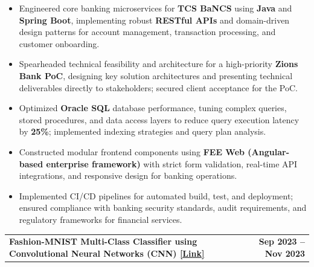 \documentclass[10pt,a4paper]{article}
\makeatletter
\newcommand{\entry}[2]{%
    \noindent
    \begin{tabularx}{\linewidth}{@{}X r@{}}
        \textbf{#1} & \textbf{#2}
    \end{tabularx}
    \vspace{-2pt}
}
\makeatother
\begin{document}
\begin{itemize}

\item Engineered core banking microservices for \textbf{TCS BaNCS} using \textbf{Java} and \textbf{Spring Boot}, implementing robust \textbf{RESTful APIs} and domain-driven design patterns for account management, transaction processing, and customer onboarding.

\item Spearheaded technical feasibility and architecture for a high-priority \textbf{Zions Bank PoC}, designing key solution architectures and presenting technical deliverables directly to stakeholders; secured client acceptance for the PoC.

\item Optimized \textbf{Oracle SQL} database performance, tuning complex queries, stored procedures, and data access layers to reduce query execution latency by \textbf{25\%}; implemented indexing strategies and query plan analysis.

\item Constructed modular frontend components using \textbf{FEE Web (Angular-based enterprise framework)} with strict form validation, real-time API integrations, and responsive design for banking operations.

\item Implemented CI/CD pipelines for automated build, test, and deployment; ensured compliance with banking security standards, audit requirements, and regulatory frameworks for financial services.

\end{itemize}

\vspace{1pt}

\entry
{Fashion-MNIST Multi-Class Classifier using Convolutional Neural Networks (CNN)
\hspace{2pt}
\href{https://github.com/marideharshith21}
{\textcolor{linkblue}{[Link]}}}
{Sep 2023 -- Nov 2023}
\end{document}
